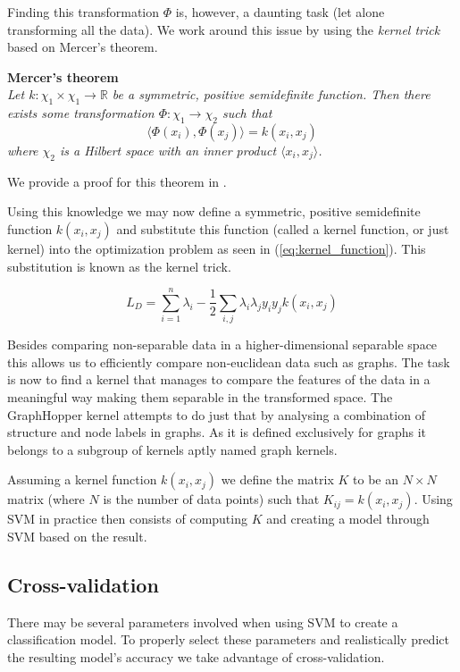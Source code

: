 \documentclass{article}
\begin{document}
Finding this transformation $\Phi$ is, however, a daunting task (let alone transforming all the data). We work around this issue by using the \textit{kernel trick} based on Mercer's theorem.

\textbf{Mercer's theorem}\\
\textit{Let $k:\chi_1\times\chi_1\rightarrow\mathbb{R}$ be a symmetric, positive semidefinite\cite{svn-introduction} function. Then there exists some transformation $\Phi:\chi_1\rightarrow\chi_2$ such that}
\begin{equation}
\langle\Phi(x_i),\Phi(x_j)\rangle=k(x_i,x_j)
\end{equation}
\textit{where $\chi_2$ is a Hilbert space with an inner product $\langle x_i, x_j\rangle$.}

We provide a proof for this theorem in \cite{svm-graph-kernels}.

Using this knowledge we may now define a symmetric, positive semidefinite function $k(x_i,x_j)$ and substitute this function (called a kernel function, or just kernel) into the optimization problem as seen in (\ref{eq:kernel_function}). This substitution is known as the kernel trick.

\begin{equation}
\label{eq:kernel_function}
L_D = \sum_{i=1}^{n}\lambda_i-\frac{1}{2}\sum_{i,j}\lambda_i\lambda_j y_iy_jk(x_i,x_j)
\end{equation}

Besides comparing non-separable data in a higher-dimensional separable space this allows us to efficiently compare non-euclidean data such as graphs. The task is now to find a kernel that manages to compare the features of the data in a meaningful way making them separable in the transformed space. The GraphHopper kernel attempts to do just that by analysing a combination of structure and node labels in graphs. As it is defined exclusively for graphs it belongs to a subgroup of kernels aptly named graph kernels.

Assuming a kernel function $k(x_i,x_j)$ we define the matrix $K$ to be an $N\times N$ matrix (where $N$ is the number of data points) such that $K_{ij}=k(x_i,x_j)$. Using SVM in practice then consists of computing $K$ and creating a model through SVM based on the result.

\subsection{Cross-validation}
There may be several parameters involved when using SVM to create a classification model. To properly select these parameters and realistically predict the resulting model's accuracy we take advantage of cross-validation.
\end{document}
